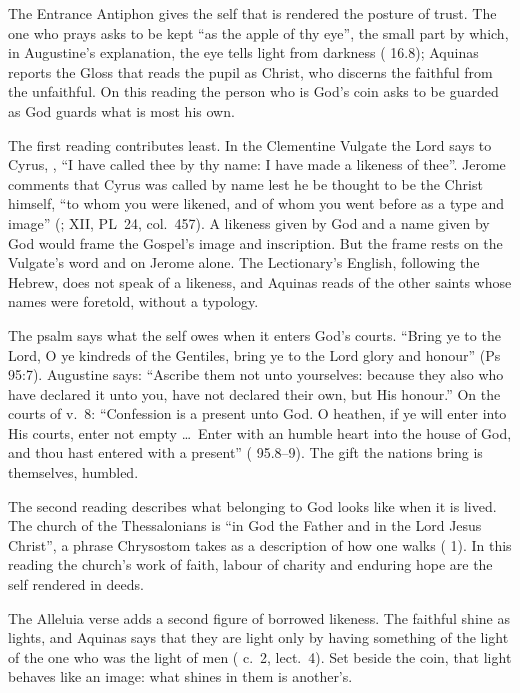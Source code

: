 The Entrance Antiphon gives the self that is rendered the posture of trust. The
one who prays asks to be kept ``as the apple of thy eye'', the small part by
which, in Augustine's explanation, the eye tells light from darkness
( 16.8); Aquinas reports the Gloss that reads
the pupil as Christ, who discerns the faithful from the unfaithful. On this
reading the person who is God's coin asks to be guarded as God guards what is
most his own.

The first reading contributes least. In the Clementine Vulgate the Lord says
to Cyrus, , ``I have called thee by
thy name: I have made a likeness of thee''. Jerome comments that Cyrus was
called by name lest he be thought to be the Christ himself, ``to whom you were
likened, and of whom you went before as a type and image'' (;  XII, PL~24, col.~457). A likeness given by God and a name given by
God would frame the Gospel's image and inscription. But the frame rests on the
Vulgate's word and on Jerome alone. The Lectionary's English, following the
Hebrew, does not speak of a likeness, and Aquinas reads  of
the other saints whose names were foretold, without a typology.

The psalm says what the self owes when it enters God's courts. ``Bring ye to
the Lord, O ye kindreds of the Gentiles, bring ye to the Lord glory and
honour'' (Ps 95:7). Augustine says: ``Ascribe them not unto yourselves:
because they also who have declared it unto you, have not declared their own,
but His honour.'' On the courts of v.~8: ``Confession is a present unto God. O
heathen, if ye will enter into His courts, enter not empty \ldots\ Enter with
an humble heart into the house of God, and thou hast entered with a present''
( 95.8--9). The gift the nations bring is
themselves, humbled.

The second reading describes what belonging to God looks like when it is
lived. The church of the Thessalonians is ``in God the Father and in the Lord
Jesus Christ'', a phrase Chrysostom takes as a description of how one walks
( 1). In this reading the church's work
of faith, labour of charity and enduring hope are the self rendered in deeds.

The Alleluia verse adds a second figure of borrowed likeness. The faithful
shine as lights, and Aquinas says that they are light only by having something
of the light of the one who was the light of men (
c.~2, lect.~4). Set beside the coin, that light behaves like an image: what
shines in them is another's.

